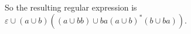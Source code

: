 \begin{problem}{2}
\begin{solution}
\begin{figure}[H]
{      }
    \end{figure}
  So the resulting regular expression is $ε ∪ (a ∪ b)((a ∪ bb) ∪ ba(a ∪ b)^*(b ∪ ba))$.
  \end{solution}
\end{problem} \newpage

